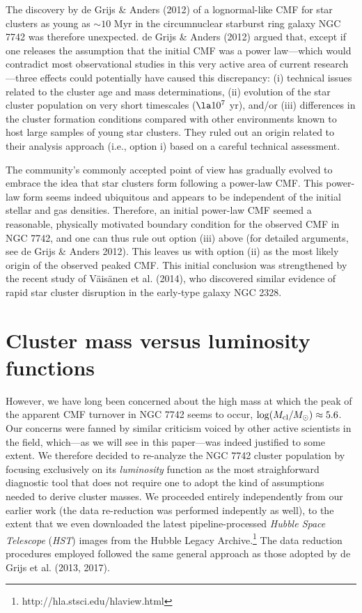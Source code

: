 \documentclass{raa}            %
\begin{document}
The discovery by de Grijs \& Anders (2012) of a lognormal-like CMF for
star clusters as young as $\sim 10$ Myr in the circumnuclear starburst
ring galaxy NGC 7742 was therefore unexpected. de Grijs \& Anders
(2012) argued that, except if one releases the assumption that the
initial CMF was a power law---which would contradict most
observational studies in this very active area of current
research---three effects could potentially have caused this
discrepancy: (i) technical issues related to the cluster age and mass
determinations, (ii) evolution of the star cluster population on very
short timescales ($\la 10^7$ yr), and/or (iii) differences in the
cluster formation conditions compared with other environments known to
host large samples of young star clusters. They ruled out an origin
related to their analysis approach (i.e., option i) based on a careful
technical assessment.

The community's commonly accepted point of view has gradually evolved
to embrace the idea that star clusters form following a power-law
CMF. This power-law form seems indeed ubiquitous and appears to be
independent of the initial stellar and gas densities. Therefore, an
initial power-law CMF seemed a reasonable, physically motivated
boundary condition for the observed CMF in NGC 7742, and one can thus
rule out option (iii) above (for detailed arguments, see de Grijs \&
Anders 2012). This leaves us with option (ii) as the most likely
origin of the observed peaked CMF. This initial conclusion was
strengthened by the recent study of V\"ais\"anen et al. (2014), who
discovered similar evidence of rapid star cluster disruption in the
early-type galaxy NGC 2328.

\section{Cluster mass versus luminosity functions}

However, we have long been concerned about the high mass at which the
peak of the apparent CMF turnover in NGC 7742 seems to occur, $\log(
M_{\rm cl} / M_\odot) \approx 5.6$. Our concerns were fanned by
similar criticism voiced by other active scientists in the field,
which---as we will see in this paper---was indeed justified to some
extent. We therefore decided to re-analyze the NGC 7742 cluster
population by focusing exclusively on its {\it luminosity} function as
the most straighforward diagnostic tool that does not require one to
adopt the kind of assumptions needed to derive cluster masses. We
proceeded entirely independently from our earlier work (the data
re-reduction was performed indepently as well), to the extent that we
even downloaded the latest pipeline-processed {\sl Hubble Space
  Telescope} ({\sl HST}) images from the Hubble Legacy
Archive.\footnote{http://hla.stsci.edu/hlaview.html} The data
reduction procedures employed followed the same general approach as
those adopted by de Grijs et al. (2013, 2017).
\end{document}
